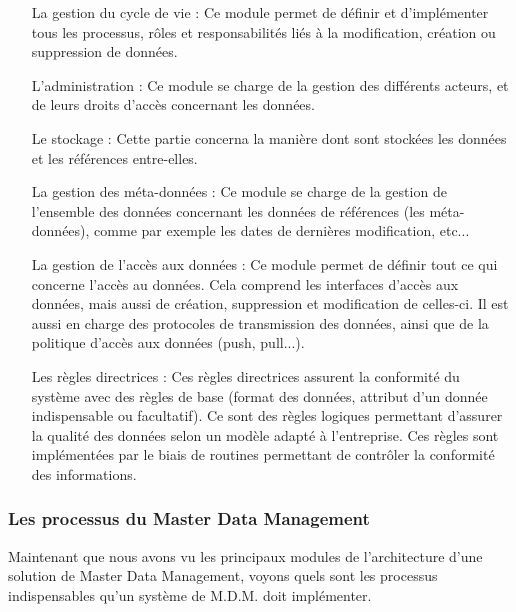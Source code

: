 \begin{itemize}

\item[La gestion du cycle de vie : ]
Ce module permet de définir et d'implémenter tous les processus, rôles et responsabilités liés à la modification, création ou suppression de données.

\item[L'administration : ]
Ce module se charge de la gestion des différents acteurs, et de leurs droits d'accès concernant les données.

\item[Le stockage : ]
Cette partie concerna la manière dont sont stockées les données et les références entre-elles.

\item[La gestion des méta-données : ]
Ce module se charge de la gestion de l'ensemble des données concernant les données de références (les méta-données), comme par exemple les dates de dernières modification, etc...

\item[La gestion de l'accès aux données : ]
Ce module permet de définir tout ce qui concerne l'accès au données. Cela comprend les interfaces d'accès aux données, mais aussi de création, suppression et modification de celles-ci. Il est aussi en charge des protocoles de transmission des données, ainsi que de la politique d'accès aux données (push, pull...).

\item[Les règles directrices : ]
Ces règles directrices assurent la conformité du système avec des règles de base (format des données, attribut d'un donnée indispensable ou facultatif). Ce sont des règles logiques permettant d'assurer la qualité des données selon un modèle adapté à l'entreprise. Ces règles sont implémentées par le biais de routines permettant de contrôler la conformité des informations.

\end{itemize}

\subsubsection{Les processus du Master Data Management}

Maintenant que nous avons vu les principaux modules de l'architecture d'une solution de Master Data Management, voyons quels sont les processus indispensables qu'un système de M.D.M. doit implémenter.


